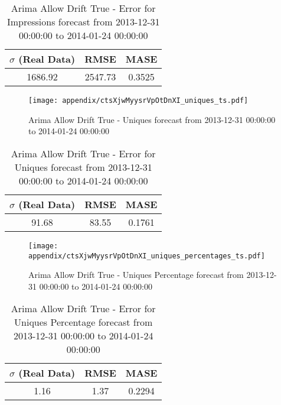 \begin{table}[H]
\centering
\footnotesize
\begin{tabular}{ccc}
$\sigma$ (Real Data) & RMSE & MASE   \\ \hline
1686.92 & 2547.73 & 0.3525 \\
\end{tabular}

\vspace{0.5cm}

\caption[]{
Arima Allow Drift True - Error for Impressions forecast from 2013-12-31 00:00:00 to 2014-01-24 00:00:00}
\end{table}

\begin{figure}[H] \begin{center} \leavevmode
\texttt{[image: appendix/ctsXjwMyysrVpOtDnXI\_uniques\_ts.pdf]} \caption[]{
Arima Allow Drift True - Uniques forecast from 2013-12-31 00:00:00 to 2014-01-24 00:00:00} \label{fig:appendix/ctsXjwMyysrVpOtDnXI_uniques_ts.pdf} \end{center}
\end{figure}

\begin{table}[H]
\centering
\footnotesize
\begin{tabular}{ccc}
$\sigma$ (Real Data) & RMSE & MASE   \\ \hline
91.68 & 83.55 & 0.1761 \\
\end{tabular}

\vspace{0.5cm}

\caption[]{
Arima Allow Drift True - Error for Uniques forecast from 2013-12-31 00:00:00 to 2014-01-24 00:00:00}
\end{table}

\begin{figure}[H] \begin{center} \leavevmode
\texttt{[image: appendix/ctsXjwMyysrVpOtDnXI\_uniques\_percentages\_ts.pdf]} \caption[]{
Arima Allow Drift True - Uniques Percentage forecast from 2013-12-31 00:00:00 to 2014-01-24 00:00:00} \label{fig:appendix/ctsXjwMyysrVpOtDnXI_uniques_percentages_ts.pdf} \end{center}
\end{figure}

\begin{table}[H]
\centering
\footnotesize
\begin{tabular}{ccc}
$\sigma$ (Real Data) & RMSE & MASE   \\ \hline
1.16 & 1.37 & 0.2294 \\
\end{tabular}

\vspace{0.5cm}

\caption[]{
Arima Allow Drift True - Error for Uniques Percentage forecast from 2013-12-31 00:00:00 to 2014-01-24 00:00:00}
\end{table}

